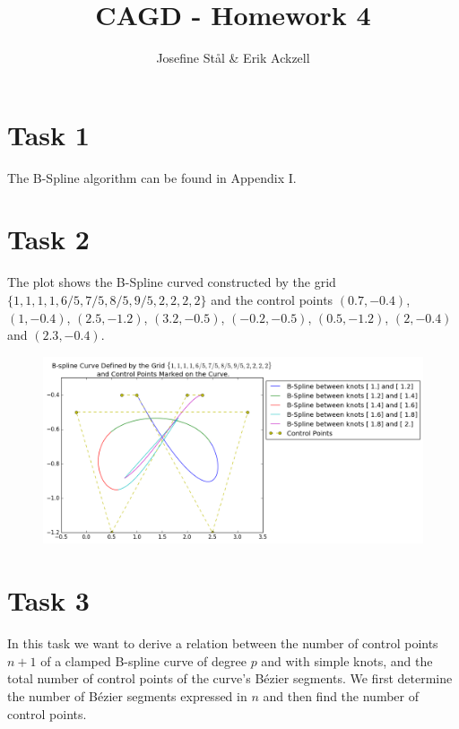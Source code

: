 \documentclass[]{article}
\title{CAGD - Homework 4}
\author{Josefine St{\aa}l \& Erik Ackzell}
\begin{document}
\maketitle
\section*{Task 1}
The B-Spline algorithm can be found in Appendix I. 

\section*{Task 2}
The plot shows the B-Spline curved constructed by the grid $\{1,1,1,1,6/5,7/5,8/5,9/5,2,2,2,2\}$ and the control points $(0.7,-0.4)$, $(1,-0.4)$, $(2.5,-1.2)$, $(3.2,-0.5)$, $(-0.2,-0.5)$, $(0.5,-1.2)$, $(2,-0.4)$ and $(2.3,-0.4)$. 
\begin{figure}[h!]
	\includegraphics[scale=0.6]{task2}
\end{figure}

\section*{Task 3}
In this task we want to derive a relation between the number of control points $n+1$ of a clamped B-spline curve of degree $p$ and with simple knots, and the total number of control points of the curve's B\'{e}zier segments. We first determine the number of B\'{e}zier segments expressed in $n$ and then find the number of control points.
\end{document}
